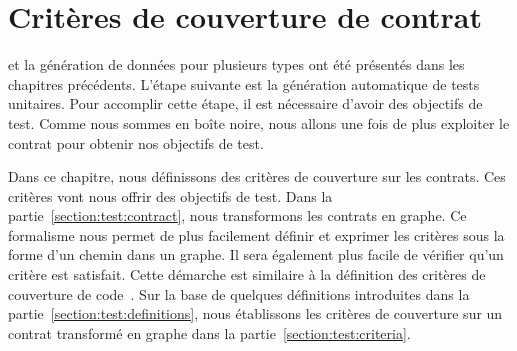\chapter{Critères de couverture de contrat}
\label{chapter:tests}

\mminitoc

 et la génération de données pour plusieurs types ont été présentés dans
les chapitres précédents. L'étape suivante est la génération automatique de
tests unitaires. Pour accomplir cette étape, il est nécessaire d'avoir des
objectifs de test. Comme nous sommes en boîte noire, nous allons une fois de
plus exploiter le contrat pour obtenir nos objectifs de test.

Dans ce chapitre, nous définissons des critères de couverture sur les contrats.
Ces critères vont nous offrir des objectifs de test. Dans la
partie~\ref{section:test:contract}, nous transformons les contrats en graphe. Ce
formalisme nous permet de plus facilement définir et exprimer les critères sous
la forme d'un chemin dans un graphe. Il sera également plus facile de vérifier
qu'un critère est satisfait. Cette démarche est similaire à la définition des
critères de couverture de code~. Sur la base de quelques
définitions introduites dans la partie~\ref{section:test:definitions}, nous
établissons les critères de couverture sur un contrat transformé en graphe dans
la partie~\ref{section:test:criteria}.

